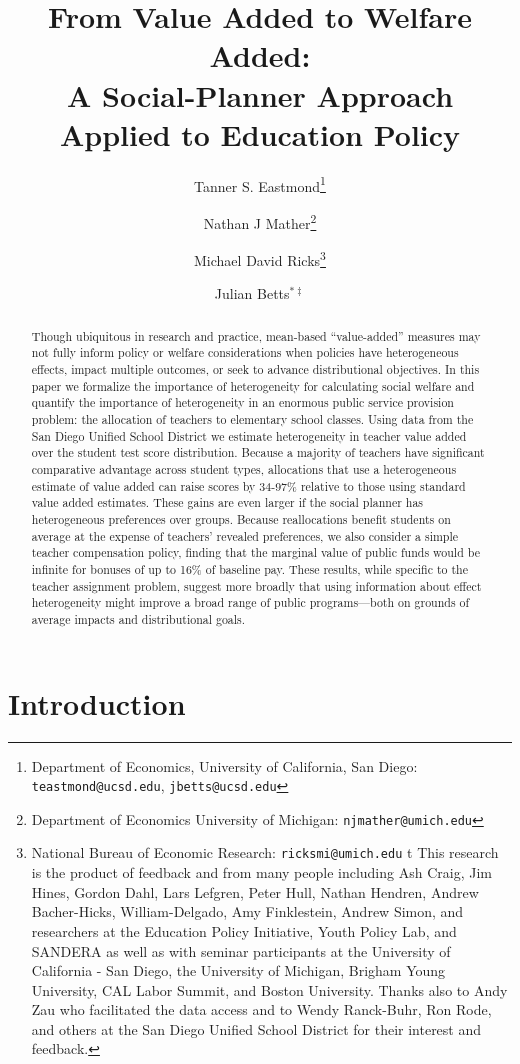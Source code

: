 \documentclass[12pt]{article}
\title{From Value Added to Welfare Added: \\ A Social-Planner Approach Applied to Education Policy}
\author{Tanner S. Eastmond\thanks{Department of Economics, University of California, San Diego: \texttt{teastmond@ucsd.edu}, \texttt{jbetts@ucsd.edu}} \and Nathan J Mather\thanks{Department of Economics University of Michigan: \texttt{njmather@umich.edu}} \and Michael David Ricks\thanks{National Bureau of Economic Research: \texttt{ricksmi@umich.edu} \hspace{17em} {\color{white}t} This research is the product of feedback and from many people including Ash Craig, Jim Hines, Gordon Dahl, Lars Lefgren, Peter Hull, Nathan Hendren, Andrew Bacher-Hicks, William-Delgado, Amy Finklestein, %
Andrew Simon, and  researchers at the Education Policy Initiative, Youth Policy Lab, and SANDERA as well as with seminar participants at the University of California - San Diego, the University of Michigan, Brigham Young University, CAL Labor Summit, and Boston University. Thanks also to Andy Zau who facilitated the data access and to  Wendy Ranck-Buhr, Ron Rode, and others at the San Diego Unified School District for their interest and feedback.} \and Julian Betts$^{*\ddagger}$}
\theoremstyle{definition}
\theoremstyle{definition}
\theoremstyle{definition}
\theoremstyle{definition}
\begin{document}
\maketitle



\begin{abstract}

Though ubiquitous in research and practice, mean-based “value-added” measures may not fully inform policy or welfare considerations when policies have heterogeneous effects, impact multiple outcomes, or seek to advance distributional objectives. In this paper we formalize the importance of heterogeneity for calculating social welfare and quantify the importance of heterogeneity in an enormous public service provision problem: the allocation of teachers to elementary school classes. Using data from the San Diego Unified School District we estimate heterogeneity in teacher value added over the student test score distribution. Because a majority of teachers have significant comparative advantage across student types, allocations that use a heterogeneous estimate of value added can raise scores by 34-97\% relative to those using standard value added estimates. These gains are even larger if the social planner has heterogeneous preferences over groups. Because reallocations benefit students on average at the expense of teachers' revealed preferences, we also consider a simple teacher compensation policy, finding that the marginal value of public funds would be infinite for bonuses of up to 16\% of baseline pay. These results, while specific to the teacher assignment problem, suggest more broadly that using information about effect heterogeneity might improve a broad range of public programs—both on grounds of average impacts and distributional goals.

\end{abstract}

\onehalfspacing

\pagebreak 

\section{Introduction}

\end{document}
